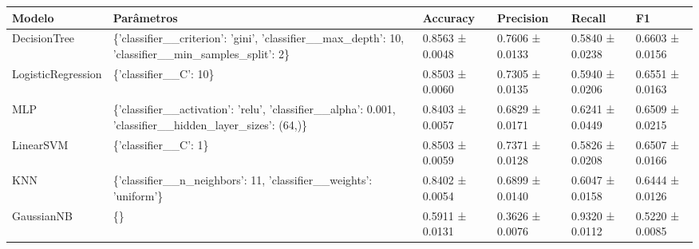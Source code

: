 \begin{tabular}{llllll}
\toprule
Modelo & Parâmetros & Accuracy & Precision & Recall & F1 \\
\midrule
DecisionTree & \{'classifier\_\_criterion': 'gini', 'classifier\_\_max\_depth': 10, 'classifier\_\_min\_samples\_split': 2\} & 0.8563 ± 0.0048 & 0.7606 ± 0.0133 & 0.5840 ± 0.0238 & 0.6603 ± 0.0156 \\
LogisticRegression & \{'classifier\_\_C': 10\} & 0.8503 ± 0.0060 & 0.7305 ± 0.0135 & 0.5940 ± 0.0206 & 0.6551 ± 0.0163 \\
MLP & \{'classifier\_\_activation': 'relu', 'classifier\_\_alpha': 0.001, 'classifier\_\_hidden\_layer\_sizes': (64,)\} & 0.8403 ± 0.0057 & 0.6829 ± 0.0171 & 0.6241 ± 0.0449 & 0.6509 ± 0.0215 \\
LinearSVM & \{'classifier\_\_C': 1\} & 0.8503 ± 0.0059 & 0.7371 ± 0.0128 & 0.5826 ± 0.0208 & 0.6507 ± 0.0166 \\
KNN & \{'classifier\_\_n\_neighbors': 11, 'classifier\_\_weights': 'uniform'\} & 0.8402 ± 0.0054 & 0.6899 ± 0.0140 & 0.6047 ± 0.0158 & 0.6444 ± 0.0126 \\
GaussianNB & \{\} & 0.5911 ± 0.0131 & 0.3626 ± 0.0076 & 0.9320 ± 0.0112 & 0.5220 ± 0.0085 \\
\bottomrule
\end{tabular}
